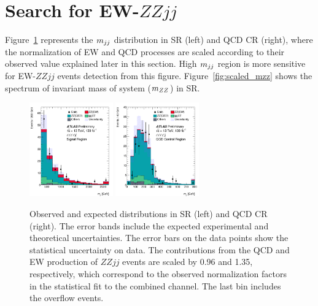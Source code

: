 \section{Search for EW-$ZZjj$}

Figure~\ref{fig:scaled_mjj} represents the $m_{jj}$ distribution in SR (left) and QCD CR (right),
where the normalization of EW and QCD processes are scaled according to their observed value explained later in this section.
High $m_{jj}$ region is more sensitive for EW-$ZZjj$ events detection from this figure.
Figure~\ref{fig:scaled_mzz} shows the spectrum of invariant mass of \llll system ($m_{ZZ}$) in SR.
\begin{figure}[!htbp]
\begin{center}
\includegraphics[width=0.32\textwidth]{figures/VBSZZ/fit/MJJ_4l_SR.pdf}
\includegraphics[width=0.32\textwidth]{figures/VBSZZ/fit/MJJ_4l_QCD_CR.pdf}
\end{center}
\caption{Observed and expected \mjj distributions in SR (left) and QCD CR (right).
        The error bands include the expected experimental and theoretical uncertainties.
        The error bars on the data points show the statistical uncertainty on data.
        The contributions from the QCD and EW production of $ZZjj$ events are scaled by 0.96 and 1.35, respectively,
        which correspond to the observed normalization factors in the statistical fit to the combined channel.
        The last bin includes the overflow events.
        }
\label{fig:scaled_mjj}
\end{figure}

